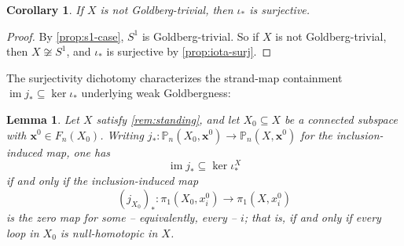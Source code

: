 \documentclass[reqno]{amsart}
\newtheorem{lemma}[theorem]{Lemma}
\newtheorem{corollary}[theorem]{Corollary}
\theoremstyle{definition}
\newcommand\bfx{\mathbf{x}}
\newcommand{\PB}{\mathbb{P}}
\newcommand{\im}{\operatorname{im}}
\newcommand{\base}{\bfx^0}
\numberwithin{equation}{section}
\begin{document}
\begin{corollary}\label{cor:not-gt-implies-surj}
If \(X\) is not Goldberg-trivial, then \(\iota_\ast\) is surjective.
\end{corollary}

\begin{proof}
By \cref{prop:s1-case}, \(S^1\) is Goldberg-trivial. So
if \(X\) is not Goldberg-trivial, then \(X\not\cong S^1\), and
\(\iota_\ast\) is surjective by \cref{prop:iota-surj}.
\end{proof}

The surjectivity dichotomy characterizes the strand-map
containment \(\im j_\ast\subseteq\ker\iota_\ast\) underlying weak
Goldbergness:

\begin{lemma}\label{lem:weak-goldberg-pi1-zero}
Let \(X\) satisfy \cref{rem:standing}, and let \(X_0\subseteq X\) be
a connected subspace with \(\base\in F_n(X_0)\). Writing
\(j_\ast\colon\PB_n(X_0,\base)\to\PB_n(X,\base)\) for the
inclusion-induced map, one has
\[
\im j_\ast\subseteq\ker\iota_\ast^X
\]
if and only if the inclusion-induced map
\[
(j_{X_0})_\ast\colon\pi_1(X_0, x_i^0)\longrightarrow
\pi_1(X, x_i^0)
\]
is the zero map for some -- equivalently, every -- \(i\); that is,
if and only if every loop in \(X_0\) is null-homotopic in \(X\).
\end{lemma}
\end{document}
